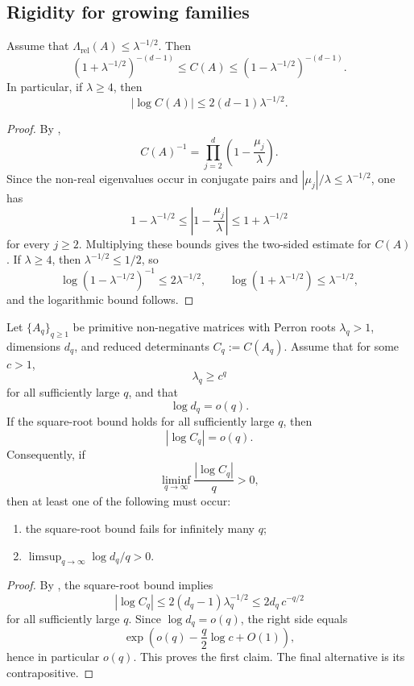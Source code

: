 \subsection{Rigidity for growing families}

\begin{proposition}
  \label{prop:finite-part-residue-constant-rh-squeeze}
  Assume that \(\Lambda_{\mathrm{rel}}(A)\le \lambda^{-1/2}\). Then
  \[
    (1+\lambda^{-1/2})^{-(d-1)}
    \le C(A)\le
    (1-\lambda^{-1/2})^{-(d-1)}.
  \]
  In particular, if \(\lambda\ge 4\), then
  \[
    |\log C(A)|\le 2(d-1)\lambda^{-1/2}.
  \]
\end{proposition}

\begin{proof}
  By ,
  \[
    C(A)^{-1}
    =\prod_{j=2}^d\left(1-\frac{\mu_j}{\lambda}\right).
  \]
  Since the non-real eigenvalues occur in conjugate pairs and
  \(|\mu_j|/\lambda\le \lambda^{-1/2}\), one has
  \[
    1-\lambda^{-1/2}
    \le \left|1-\frac{\mu_j}{\lambda}\right|
    \le 1+\lambda^{-1/2}
  \]
  for every \(j\ge 2\). Multiplying these bounds gives the two-sided
  estimate for \(C(A)\). If \(\lambda\ge 4\), then
  \(\lambda^{-1/2}\le 1/2\), so
  \[
    \log(1-\lambda^{-1/2})^{-1}\le 2\lambda^{-1/2},
    \qquad
    \log(1+\lambda^{-1/2})\le \lambda^{-1/2},
  \]
  and the logarithmic bound follows.
\end{proof}

\begin{theorem}
  \label{thm:finite-part-residue-drift-trichotomy}
  Let \(\{A_q\}_{q\ge 1}\) be primitive non-negative matrices with
  Perron roots \(\lambda_q>1\), dimensions \(d_q\), and reduced
  determinants \(C_q:=C(A_q)\). Assume that for some \(c>1\),
  \[
    \lambda_q\ge c^q
  \]
  for all sufficiently large \(q\), and that
  \[
    \log d_q=o(q).
  \]
  If the square-root bound holds for all sufficiently large \(q\), then
  \[
    |\log C_q|=o(q).
  \]
  Consequently, if
  \[
    \liminf_{q\to\infty}\frac{|\log C_q|}{q}>0,
  \]
  then at least one of the following must occur:
  \begin{enumerate}[label=\textup{(\roman*)}]
    \item the square-root bound fails for infinitely many \(q\);
    \item \(\limsup_{q\to\infty}\log d_q/q>0\).
  \end{enumerate}
\end{theorem}

\begin{proof}
  By , the
  square-root bound
  implies
  \[
    |\log C_q|
    \le 2(d_q-1)\lambda_q^{-1/2}
    \le 2d_q\,c^{-q/2}
  \]
  for all sufficiently large \(q\). Since \(\log d_q=o(q)\), the right
  side equals
  \[
    \exp\!\left(o(q)-\frac{q}{2}\log c+O(1)\right),
  \]
  hence in particular \(o(q)\). This proves the first claim. The final
  alternative is its contrapositive.
\end{proof}
